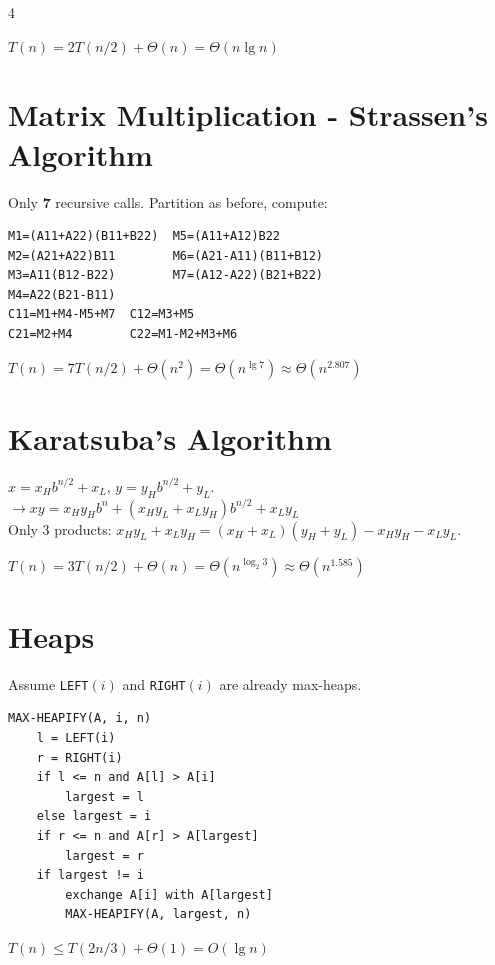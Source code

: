 \documentclass[8pt,a4paper,landscape]{extarticle}
\begin{document}
\begin{multicols*}{4}
\begin{prop}[title=Runtime]
$T(n)=2T(n/2)+\Theta(n)=\Theta(n\lg n)$
\end{prop}

\section{Matrix Multiplication - Strassen's Algorithm}

Only \textbf{7} recursive calls. Partition as before, compute:
\begin{lstlisting}
M1=(A11+A22)(B11+B22)  M5=(A11+A12)B22
M2=(A21+A22)B11        M6=(A21-A11)(B11+B12)
M3=A11(B12-B22)        M7=(A12-A22)(B21+B22)
M4=A22(B21-B11)
C11=M1+M4-M5+M7  C12=M3+M5
C21=M2+M4        C22=M1-M2+M3+M6
\end{lstlisting}
\begin{prop}[title=Runtime]
$T(n)=7T(n/2)+\Theta(n^2)=\Theta(n^{\lg 7})\approx\Theta(n^{2.807})$
\end{prop}

\section{Karatsuba's Algorithm}
$x=x_H b^{n/2}+x_L$, $y=y_H b^{n/2}+y_L$.\\
$\rightarrow xy=x_Hy_H b^n+(x_Hy_L+x_Ly_H)b^{n/2}+x_Ly_L$\\
Only 3 products: $x_Hy_L+x_Ly_H=(x_H{+}x_L)(y_H{+}y_L)-x_Hy_H-x_Ly_L$.

\begin{prop}[title=Runtime]
$T(n)=3T(n/2)+\Theta(n)=\Theta(n^{\log_2 3})\approx\Theta(n^{1.585})$
\end{prop}

\section{Heaps}
Assume \texttt{LEFT}$(i)$ and \texttt{RIGHT}$(i)$ are already max-heaps.

\begin{lstlisting}
MAX-HEAPIFY(A, i, n)
    l = LEFT(i)
    r = RIGHT(i)
    if l <= n and A[l] > A[i]
        largest = l
    else largest = i
    if r <= n and A[r] > A[largest]
        largest = r
    if largest != i
        exchange A[i] with A[largest]
        MAX-HEAPIFY(A, largest, n)
\end{lstlisting}

\begin{prop}[title=Runtime]
$T(n) \le T(2n/3) + \Theta(1) = O(\lg n)$
\end{prop}


\end{multicols*}
\end{document}
